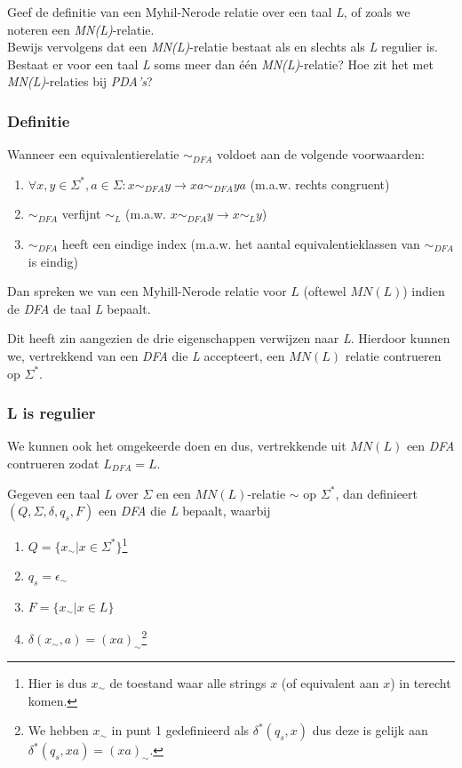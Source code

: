 
\begin{quest}
  Geef de definitie van een Myhil-Nerode relatie over een taal \emph{L}, of zoals we noteren een \emph{MN(L)}-relatie. \\
  Bewijs vervolgens dat een \emph{MN(L)}-relatie bestaat als en slechts als \emph{L} regulier is. Bestaat er voor een taal \emph{L} soms meer dan één \emph{MN(L)}-relatie? Hoe zit het met \emph{MN(L)}-relaties bij \emph{PDA’s}?
\end{quest}

\subsubsection*{Definitie}

\begin{theorem}
  Wanneer een equivalentierelatie $\sim_{DFA}$ voldoet aan de volgende voorwaarden:
  \begin{enumerate}
    \item $\forall x, y \in \Sigma^*, a \in \Sigma : x \sim_{DFA} y \rightarrow xa \sim_{DFA} ya$ (m.a.w. rechts congruent)
    \item $\sim_{DFA}$ verfijnt $\sim_L$ (m.a.w. $x \sim_{DFA} y \rightarrow x \sim_L y$)
    \item $\sim_{DFA}$ heeft een eindige index (m.a.w. het aantal equivalentieklassen van $\sim_{DFA}$ is eindig)
  \end{enumerate}
  Dan spreken we van een Myhill-Nerode relatie voor $L$ (oftewel $MN(L)$) indien de \emph{DFA} de taal \emph{L} bepaalt.
\end{theorem}

Dit heeft zin aangezien de drie eigenschappen verwijzen naar \emph{L}. Hierdoor kunnen we, vertrekkend van een \emph{DFA} die \emph{L} accepteert, een $MN(L)$ relatie contrueren op $\Sigma^*$.

\subsubsection*{L is regulier}

We kunnen ook het omgekeerde doen en dus, vertrekkende uit $MN(L)$ een \emph{DFA} contrueren zodat $L_{DFA} = L$.

\begin{theorem}
  Gegeven een taal \emph{L} over $\Sigma$ en een $MN(L)$-relatie $\sim$ op $\Sigma^*$, dan definieert $(Q,\Sigma,\delta,q_s,F)$ een \emph{DFA} die \emph{L} bepaalt, waarbij
  \begin{enumerate}
    \item $Q = \{x_{\sim}|x \in \Sigma^*\}$\footnote{Hier is dus $x_{\sim}$ de toestand waar alle strings $x$ (of equivalent aan $x$) in terecht komen.}
    \item $q_s = \epsilon_{\sim}$
    \item $F = \{x_{\sim}|x \in L\}$
    \item $\delta(x_{\sim},a) = (xa)_{\sim}$\footnote{We hebben $x_{\sim}$ in punt 1 gedefinieerd als $\delta^*(q_s,x)$ dus deze is gelijk aan $\delta^*(q_s,xa) = (xa)_{\sim}$.}
  \end{enumerate}
\end{theorem}

